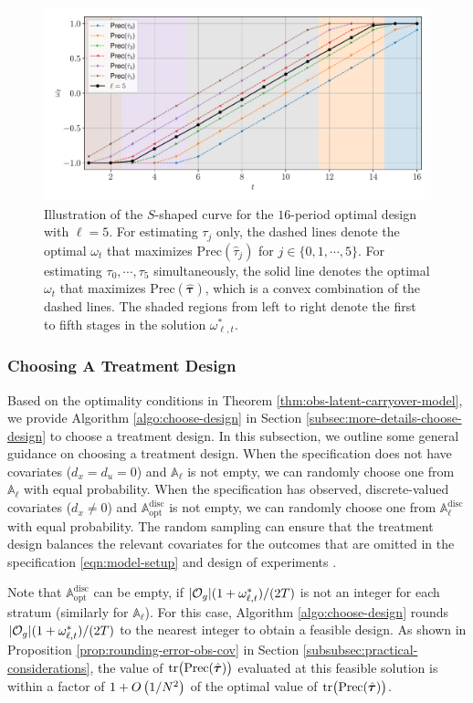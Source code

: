     \begin{figure}[t!]
		\centering
		\includegraphics[width=0.5\linewidth]{plots/illustration/carryover-t-optimal-s-curve.pdf}
		\caption{Illustration of the $S$-shaped curve for the $ 16$-period optimal design with $\ell = 5$. For estimating $\tau_j$ only, the dashed lines denote the optimal $\omega_t$ that maximizes $\mathrm{Prec}(\hat{\tau}_j)$ for $j \in \{0,1,\cdots,5\}$. For estimating $\tau_0, \cdots, \tau_5$ simultaneously, the solid line denotes the optimal $\omega_t$ that maximizes $\mathrm{Prec}(\hat{\bm{\tau}})$, which is a convex combination of the dashed lines. The shaded regions from left to right denote the first to fifth stages in the solution $\omega^\ast_{\ell,t}$.  }
		\label{fig:carryover-treatment-effect-t-opt-s-curve}
	\end{figure}


	

 \subsubsection{Choosing A Treatment Design}\label{subsec:choose-a-design}\texttt{}
	
	{\blue Based on the optimality conditions in Theorem \ref{thm:obs-latent-carryover-model}, we provide Algorithm \ref{algo:choose-design} in Section \ref{subsec:more-details-choose-design} to choose a treatment design.} In this subsection, we outline some general guidance on choosing a treatment design. When the specification does not have covariates ($d_x = d_u = 0$) and $\mathbb{A}_{\ell} $ is not empty, we can randomly choose one from $\mathbb{A}_\ell$ with equal probability. When the specification has observed, discrete-valued covariates ($d_x \neq 0$) and $\mathbb{A}^{\mathrm{disc}}_{\mathrm{opt}}$ is not empty, we can randomly choose one from $\mathbb{A}^{\mathrm{disc}}_\ell$ with equal probability. The random sampling can ensure that the treatment design balances the relevant covariates for the outcomes that are omitted in the specification \eqref{eqn:model-setup} and design of experiments \citep{hayes2017cluster}. 
	
	Note that $\mathbb{A}^{\mathrm{disc}}_{\mathrm{opt}}$ can be empty, if $|\mathcal{O}_g|(1+\omega_{\ell,t}^\ast)/(2T)$ is not an integer for each stratum (similarly for $\mathbb{A}_{\ell} $). For this case, Algorithm \ref{algo:choose-design} rounds $|\mathcal{O}_g|(1+\omega_{\ell,t}^\ast)/(2T)$ to the nearest integer to obtain a feasible design. As shown in Proposition \ref{prop:rounding-error-obs-cov} in Section \ref{subsubsec:practical-considerations}, the value of $\mathrm{tr} \big(\mathrm{Prec}(\hat{\bm{\tau}})  \big)$ evaluated at this feasible solution is within a factor of $1 + O \left( {1}/{N^2} \right)$ of the optimal value of $\mathrm{tr} \big(\mathrm{Prec}(\hat{\bm{\tau}})  \big)$.
	
